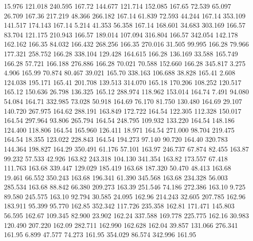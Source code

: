   15.976  121.018  240.595       167.72
 144.677  121.714  152.085       167.65
  72.539   65.097   26.709       167.36
 217.219   48.366  266.182       167.14
  61.839   72.593   44.244       167.14
 353.109  141.517  174.143       167.14
   5.214   41.353   56.358       167.14
 168.601   34.683  303.169       166.57
  83.704  121.175  210.943       166.57
 189.014  107.094  316.804       166.57
 342.054  142.178  162.162       166.35
  84.032  166.432  268.256       166.35
 270.016   31.505   99.995       166.28
  79.966  177.321  258.752       166.28
 338.104  129.428  164.615       166.28
 136.169   33.588  165.749       166.28
  57.721  166.188  276.886       166.28
  70.021   70.588  152.660       166.28
 345.817    3.275    4.906       165.99
  70.874   80.467   39.021       165.70
 338.163  106.688   38.828       165.41
   2.608  124.038  195.171       165.41
 201.708  139.513  314.070       165.18
 170.206  108.252  120.517       165.12
 150.636   26.798  136.325       165.12
 288.974  118.962  153.014       164.74
   7.491   94.080   54.084       164.71
 332.985   73.028   50.918       164.69
  76.170   81.750  130.480       164.69
  29.107  140.720  267.975       164.62
 288.191  163.849  172.722       164.54
 122.305  112.328  150.017       164.54
 297.964   93.806  265.794       164.54
 248.795  109.932  133.220       164.54
 148.186  124.400  118.806       164.54
 165.960  126.411   18.971       164.54
 271.000   98.704  219.475       164.54
  18.355  123.022  228.843       164.54
 194.273   97.140   90.720       164.40
 320.783  144.364  198.827       164.29
 350.491   61.176   57.101       163.97
 246.737   67.874   82.455       163.87
  99.232   57.533   42.926       163.82
 243.318  104.130  341.354       163.82
 173.557   67.418  111.763       163.68
 339.447  129.029  185.419       163.68
 187.320   50.470   48.413       163.68
  19.461   66.552  350.243       163.68
 196.341   61.390  345.568       163.68
 234.328   56.003  285.534       163.68
  88.842   66.380  209.273       163.39
 251.546   74.186  272.386       163.10
   9.725   89.580  245.575       163.10
  92.794   30.585   24.095       162.96
 214.243   32.605  207.785       162.96
 183.911   95.399   95.770       162.85
 352.342  117.726  235.358       162.81
 171.471  145.803   56.595       162.67
 109.345   82.900   23.902       162.24
 337.588  169.778  225.775       162.16
  30.983  120.490  207.220       162.09
 282.711  162.990  162.628       162.04
  39.857  131.066  276.341       161.95
   6.899   47.577   74.273       161.95
 354.029   86.574  342.996       161.95
